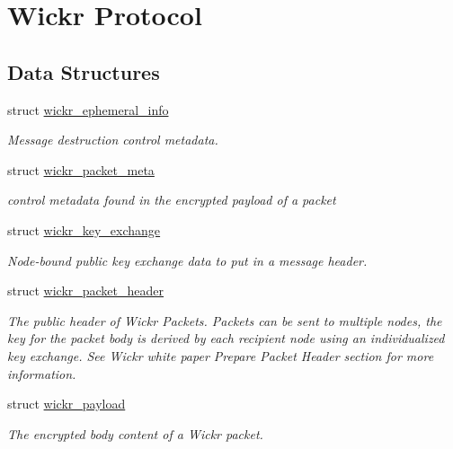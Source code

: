 \hypertarget{group__wickr__protocol}{}\section{Wickr Protocol}
\label{group__wickr__protocol}
\subsection*{Data Structures}
\begin{DoxyCompactItemize}
\item 
struct \mbox{\hyperlink{structwickr__ephemeral__info}{wickr\+\_\+ephemeral\+\_\+info}}
\begin{DoxyCompactList}\small\item\em Message destruction control metadata. \end{DoxyCompactList}\item 
struct \mbox{\hyperlink{structwickr__packet__meta}{wickr\+\_\+packet\+\_\+meta}}
\begin{DoxyCompactList}\small\item\em control metadata found in the encrypted payload of a packet \end{DoxyCompactList}\item 
struct \mbox{\hyperlink{structwickr__key__exchange}{wickr\+\_\+key\+\_\+exchange}}
\begin{DoxyCompactList}\small\item\em Node-\/bound public key exchange data to put in a message header. \end{DoxyCompactList}\item 
struct \mbox{\hyperlink{structwickr__packet__header}{wickr\+\_\+packet\+\_\+header}}
\begin{DoxyCompactList}\small\item\em The public header of Wickr Packets. Packets can be sent to multiple nodes, the key for the packet body is derived by each recipient node using an individualized key exchange. See Wickr white paper \textquotesingle{}Prepare Packet Header\textquotesingle{} section for more information. \end{DoxyCompactList}\item 
struct \mbox{\hyperlink{structwickr__payload}{wickr\+\_\+payload}}
\begin{DoxyCompactList}\small\item\em The encrypted body content of a Wickr packet. \end{DoxyCompactList}\item 

\end{DoxyCompactItemize}
